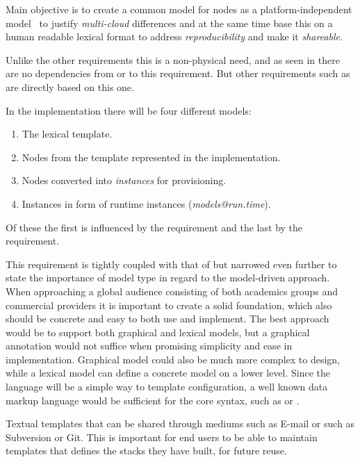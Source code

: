 Main objective is to create a common model for nodes as a platform-independent 
model~\cite{agile:cuong10} to justify \emph{multi-cloud} differences and 
at the same time base this on a human readable lexical format to address \emph{reproducibility} and
make it \emph{shareable}.

Unlike the other requirements this is a non-physical need, 
and as seen in 
there are no dependencies from or to this requirement.
But other requirements such as  are directly based on this one.

In the implementation there will be four different models:
\begin{enumerate}
  \item The lexical template.
  \item Nodes from the template represented in the implementation.
  \item Nodes converted into \emph{instances} for provisioning.
  \item Instances in form of runtime instances (\emph{models@run.time}).
\end{enumerate}
Of these the first is influenced by the  requirement and
the last by the  requirement.

This requirement is tightly coupled with that of  but narrowed 
even further to state the importance of model type in regard to the model-driven approach.
When approaching a global audience consisting of both academics groups and commercial
providers it is important to create a solid foundation, 
which also should be concrete and easy to both use and implement.
The best approach would be to support both graphical and lexical models, 
but a graphical annotation would not suffice when promising simplicity and ease in implementation. 
Graphical model could also be much more complex to design, 
while a lexical model can define a concrete model on a lower level.
Since the language will be a simple way to template configuration, 
a well known data markup language would be sufficient for the core syntax, such as 
 or .

Textual templates that can be shared through mediums such as E-mail or 
 such as Subversion or Git.
This is important for end users to be able to maintain templates that defines the stacks they have built, 
for future reuse.

